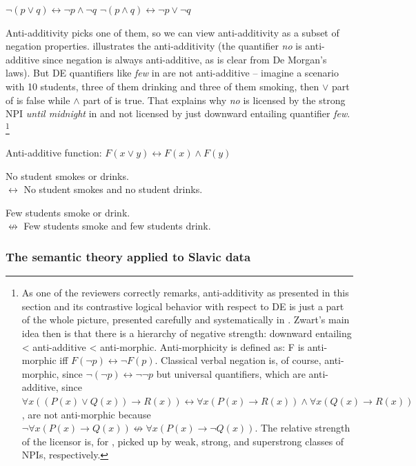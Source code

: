\documentclass[output=paper,colorlinks,citecolor=brown]{langscibook}
\begin{document}
\ea\label{ex:deMorgan}\ea \(\neg(p \vee q) \leftrightarrow \neg p \wedge \neg q\)  
\ex \(\neg(p \wedge q) \leftrightarrow \neg p \vee \neg q\)
\z
\z

\noindent Anti-additivity picks one of them, so we can view anti-additivity as a subset of negation properties.  illustrates the anti-additivity (the quantifier \textit{no} is anti-additive since negation is always anti-additive, as is clear from De Morgan's laws). But DE quantifiers like \textit{few} in  are not anti-additive -- imagine a scenario with 10 students, three of them drinking and three of them smoking, then \(\vee\) part of  is false while \(\wedge\) part of  is true. That explains why \emph{no} is licensed by the strong NPI \emph{until midnight} in  and not licensed by just downward entailing quantifier \emph{few}.%
\footnote{As one of the reviewers correctly remarks, anti-additivity as presented in this section and its contrastive logical behavior with respect to DE is just a part of the whole picture, presented carefully and systematically in \citet{zwarts1998three}. Zwart's main idea then is that there is a hierarchy of negative strength: downward entailing < anti-additive < anti-morphic. Anti-morphicity is defined as: F is anti-morphic iff $F(\neg p) \leftrightarrow \neg F(p)$. Classical verbal negation is, of course, anti-morphic, since $\neg(\neg p) \leftrightarrow \neg\neg p$ but universal quantifiers, which are anti-additive, since $\forall x((P(x) \vee Q(x)) \rightarrow R(x)) \leftrightarrow \forall x(P(x) \rightarrow R(x)) \wedge \forall x(Q(x) \rightarrow R(x)) $, are not anti-morphic because $\neg \forall x(P(x) \rightarrow Q(x)) \not\leftrightarrow \forall x(P(x) \rightarrow \neg Q(x))$. The relative strength of the licensor is, for \citet{zwarts1998three}, picked up by weak, strong, and superstrong classes of NPIs, respectively.}

\ea\label{ex:25} Anti-additive function: \(F(x \vee y) \leftrightarrow F(x) \wedge F(y)\)
\z

\ea\label{ex:26} No student smokes or drinks.\\\(\leftrightarrow\) No student smokes and no student drinks.
\z

\ea\label{ex:27} Few students smoke or drink.\\\(\not\leftrightarrow\) Few students smoke and few students drink.
\z


\subsubsection{The semantic theory applied to Slavic data}\label{semantic-theory-applied-to-slavic-data}
\end{document}
